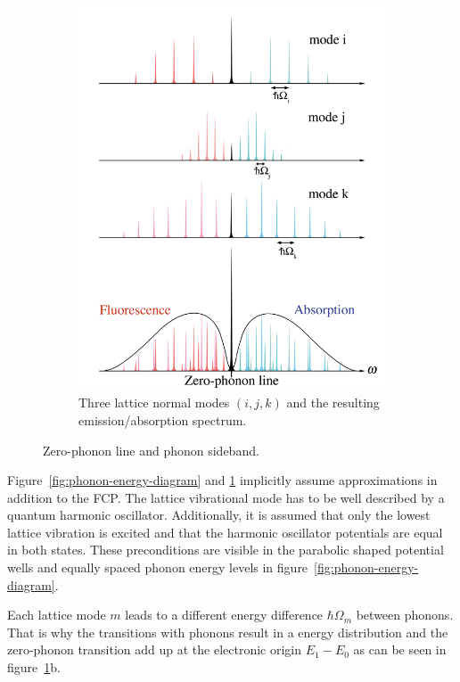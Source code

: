 \begin{figure}[H]
\begin{subfigure}[b]{0.48\textwidth}
		\includegraphics[width=\textwidth]{figures/quantum-dot/Lattice-modes}
		\caption{Three lattice normal modes $(i, j, k)$ and the resulting emission/absorption spectrum.\\}
		\label{fig:lattice-modes}
	\end{subfigure}
	\caption{Zero-phonon line and phonon sideband.~\cite{noauthor_zero-phonon_nodate}}
	\label{fig:zero-phonon-line-phonon-side-band}
\end{figure}

Figure~\ref{fig:phonon-energy-diagram} and \ref{fig:lattice-modes} implicitly assume approximations in addition to the \ac{FCP}.
The lattice vibrational mode has to be well described by a quantum harmonic oscillator.
Additionally, it is assumed that only the lowest lattice vibration is excited and that the harmonic oscillator potentials are equal in both states.
These preconditions are visible in the parabolic shaped potential wells and equally spaced phonon energy levels in figure~\ref{fig:phonon-energy-diagram}.

Each lattice mode $m$ leads to a different energy difference $\hbar \Omega_m$ between phonons.
That is why the transitions with phonons result in a energy distribution and the zero-phonon transition add up at the electronic origin $E_1 - E_0$ as can be seen in figure~\ref{fig:lattice-modes}b.

